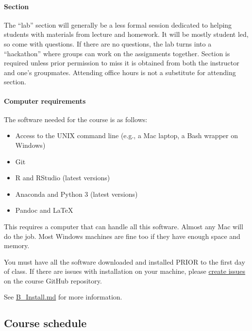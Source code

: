 \documentclass[
]{article}
\providecommand{\tightlist}{%
  \setlength{\itemsep}{0pt}\setlength{\parskip}{0pt}}
\begin{document}
\hypertarget{section}{%
\paragraph{Section}\label{section}}

The ``lab'' section will generally be a less formal session dedicated to
helping students with materials from lecture and homework. It will be
mostly student led, so come with questions. If there are no questions,
the lab turns into a ``hackathon'' where groups can work on the
assignments together. Section is required unless prior permission to
miss it is obtained from both the instructor and one's groupmates.
Attending office hours is not a substitute for attending section.

\hypertarget{computer-requirements}{%
\paragraph{Computer requirements}\label{computer-requirements}}

The software needed for the course is as follows:

\begin{itemize}
\tightlist
\item
  Access to the UNIX command line (e.g., a Mac laptop, a Bash wrapper on
  Windows)
\item
  Git
\item
  R and RStudio (latest versions)
\item
  Anaconda and Python 3 (latest versions)
\item
  Pandoc and LaTeX
\end{itemize}

This requires a computer that can handle all this software. Almost any
Mac will do the job. Most Windows machines are fine too if they have
enough space and memory.

You must have all the software downloaded and installed PRIOR to the
first day of class. If there are issues with installation on your
machine, please
\href{https://github.com/PS239T/spring_2021/issues}{create issues} on
the course GitHub repository.

See
\href{https://github.com/jaeyk/PS239T/blob/master/B_Install.md}{B\_Install.md}
for more information.

\hypertarget{course-schedule}{%
\subsection{Course schedule}\label{course-schedule}}
\end{document}
